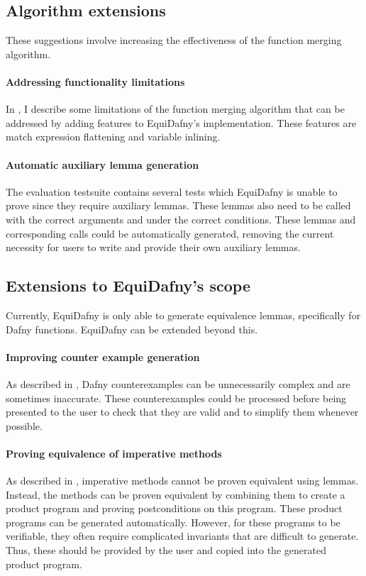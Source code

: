 \subsection{Algorithm extensions}

These suggestions involve increasing the effectiveness of the function merging algorithm. 

\paragraph{Addressing functionality limitations} In , I describe some limitations of the function merging algorithm that can be addressed by adding features to EquiDafny's implementation. These features are match expression flattening and variable inlining. 

\paragraph{Automatic auxiliary lemma generation} The evaluation testsuite contains several tests which EquiDafny is unable to prove since they require auxiliary lemmas. These lemmas also need to be called with the correct arguments and under the correct conditions. These lemmas and corresponding calls could be automatically generated, removing the current necessity for users to write and provide their own auxiliary lemmas.

\subsection{Extensions to EquiDafny's scope}

Currently, EquiDafny is only able to generate equivalence lemmas, specifically for Dafny functions. EquiDafny can be extended beyond this.

\paragraph{Improving counter example generation} As described in , Dafny counterexamples can be unnecessarily complex and are sometimes inaccurate. These counterexamples could be processed before being presented to the user to check that they are valid and to simplify them whenever possible.

\paragraph{Proving equivalence of imperative methods} As described in , imperative methods cannot be proven equivalent using lemmas. Instead, the methods can be proven equivalent by combining them to create a product program and proving postconditions on this program. These product programs can be generated automatically. However, for these programs to be verifiable, they often require complicated invariants that are difficult to generate. Thus, these should be provided by the user and copied into the generated product program.

